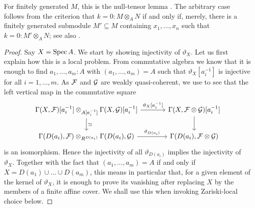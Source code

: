 For finitely generated $M$, this is the null-tensor lemma \cite[Lemma IV-4.14]{lombardi-quitte}.
The arbitrary case follows from the criterion that $k=0 : M\otimes_A N$ if and only if, merely, there is a finitely generated submodule $M'\subseteq M$ containing $x_1,\ldots,x_n$ such that $k = 0 : M' \otimes_A N$; see also \cite[Exercise IV-4]{lombardi-quitte}.

\begin{proof}
  Say $X = \operatorname{Spec} A$.
  We start by showing injectivity of $\vartheta_X$.
  Let us first explain how this is a local problem.
  From commutative algebra we know that it is enough to find $a_1,\hdots,a_m:A$ with $(a_1,\hdots,a_m) = A$ such that $\vartheta_X[a_i^{-1}]$ is injective for all $i=1,\hdots,m$.
  As $\mathcal{F}$ and $\mathcal{G}$ are weakly quasi-coherent, we use \cite[Lemma 7.1.8]{draft} to see that the left vertical map in the commutative square
  \[ \begin{tikzcd}[column sep=large]
    \Gamma(X,\mc F)[a_i^{-1}] \otimes_{A[a_i^{-1}]} \Gamma(X,\mc G)[a_i^{-1}] \ar[d, "\simeq"]\ar[r, "\vartheta_X{[a_i^{-1}]}"]
    &
    \Gamma(X, \mc F \otimes \mc G)[a_i^{-1}] \ar[d]
    \\
    \Gamma(D(a_i),\mc F) \otimes_{R^{D(a_i)}}\Gamma(D(a_i),\mc G) \ar[r, "\vartheta_{D(a_i)}"]
    &
    \Gamma(D(a_i),\mc F \otimes \mc G)
  \end{tikzcd}
  \]
  is an isomorphism.
  Hence the injectivity of all $\vartheta_{D(a_i)}$ implies the injectivity of $\vartheta_X$.
  Together with the fact that $(a_1,\hdots,a_m) = A$ if and only if $X = D(a_1) \cup \hdots \cup D(a_m)$, this means in particular that, for a given element of the kernel of $\vartheta_X$, it is enough to prove its vanishing after replacing $X$ by the members of a finite affine cover. We shall use this when invoking Zariski-local choice below.


\end{proof}
